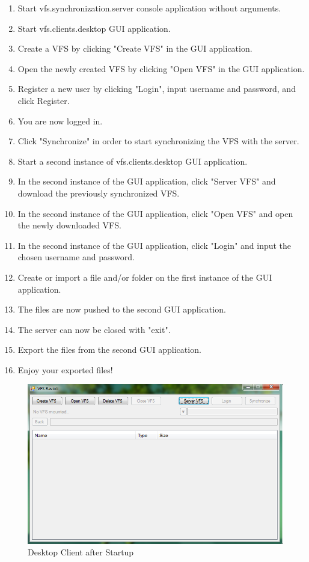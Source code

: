 \documentclass[a4paper,12pt]{article}
\begin{document}
\begin{enumerate}
    \item Start vfs.synchronization.server console application without arguments.
    \item Start vfs.clients.desktop GUI application.
    \item Create a VFS by clicking "Create VFS" in the GUI application.
    \item Open the newly created VFS by clicking "Open VFS" in the GUI application.
    \item Register a new user by clicking "Login", input username and password, and click Register.
    \item You are now logged in.
    \item Click "Synchronize" in order to start synchronizing the VFS with the server.
    \item Start a second instance of vfs.clients.desktop GUI application.
    \item In the second instance of the GUI application, click "Server VFS" and download the previously synchronized VFS.
    \item In the second instance of the GUI application, click "Open VFS" and open the newly downloaded VFS.
    \item In the second instance of the GUI application, click "Login" and input the chosen username and password.
    \item Create or import a file and/or folder on the first instance of the GUI application.
    \item The files are now pushed to the second GUI application.
		\item The server can now be closed with "exit".
    \item Export the files from the second GUI application.
    \item Enjoy your exported files!
\end{enumerate}

\begin{figure}[H]
\centering
\includegraphics[width=1.00\textwidth]{basicApp.png}
\caption{Desktop Client after Startup}
\label{fig:basicApp}
\end{figure}
	
\end{document}
